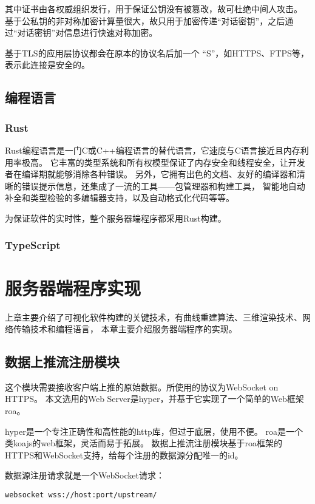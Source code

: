 其中证书由各权威组织发行，用于保证公钥没有被篡改，故可杜绝中间人攻击。
基于公私钥的非对称加密计算量很大，故只用于加密传递“对话密钥”，之后通过“对话密钥”对信息进行快速对称加密。

基于TLS的应用层协议都会在原本的协议名后加一个 “S”，如HTTPS、FTPS等，表示此连接是安全的。

\subsection{编程语言}

\subsubsection{Rust}
Rust编程语言\cite{rust}是一门C或C++编程语言的替代语言，它速度与C语言接近且内存利用率极高。
它丰富的类型系统和所有权模型保证了内存安全和线程安全，让开发者在编译期就能够消除各种错误。
另外，它拥有出色的文档、友好的编译器和清晰的错误提示信息，还集成了一流的工具——包管理器和构建工具，
智能地自动补全和类型检验的多编辑器支持，以及自动格式化代码等等。

为保证软件的实时性，整个服务器端程序都采用Rust构建。

\subsubsection{TypeScript}

\section{服务器端程序实现}
\label{sec:server}
上章主要介绍了可视化软件构建的关键技术，有曲线重建算法、三维渲染技术、网络传输技术和编程语言，
本章主要介绍服务器端程序的实现。
 
\subsection{数据上推流注册模块}
这个模块需要接收客户端上推的原始数据。所使用的协议为WebSocket on HTTPS。
本文选用的Web Server是hyper\cite{hyper}，并基于它实现了一个简单的Web框架roa\cite{roa}。

hyper是一个专注正确性和高性能的http库，但过于底层，使用不便。
roa是一个类koajs\cite{koajs}的web框架，灵活而易于拓展。
数据上推流注册模块基于roa框架的HTTPS和WebSocket支持，给每个注册的数据源分配唯一的id。

数据源注册请求就是一个WebSocket请求：

\begin{lstlisting}[label={lst:register-source},caption={发起数据源注册请求}]
websocket wss://host:port/upstream/
\end{lstlisting}

